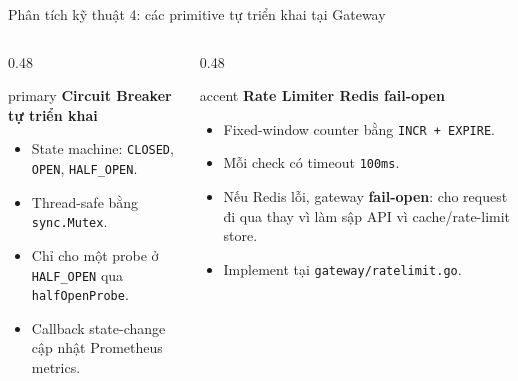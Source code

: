 \documentclass[aspectratio=169]{beamer}
\begin{document}
\begin{frame}{Phân tích kỹ thuật 4: các primitive tự triển khai tại Gateway}
    \begin{columns}[T,onlytextwidth]
        \begin{column}{0.48\textwidth}
            \begin{claimbox}{primary}
                \textbf{Circuit Breaker tự triển khai}
                \begin{itemize}\small
                    \item State machine: \texttt{CLOSED}, \texttt{OPEN}, \texttt{HALF\_OPEN}.
                    \item Thread-safe bằng \texttt{sync.Mutex}.
                    \item Chỉ cho một probe ở \texttt{HALF\_OPEN} qua \texttt{halfOpenProbe}.
                    \item Callback state-change cập nhật Prometheus metrics.
                \end{itemize}
            \end{claimbox}
        \end{column}
        \begin{column}{0.48\textwidth}
            \begin{claimbox}{accent}
                \textbf{Rate Limiter Redis fail-open}
                \begin{itemize}\small
                    \item Fixed-window counter bằng \texttt{INCR + EXPIRE}.
                    \item Mỗi check có timeout \texttt{100ms}.
                    \item Nếu Redis lỗi, gateway \textbf{fail-open}: cho request đi qua thay vì làm sập API vì cache/rate-limit store.
                    \item Implement tại \texttt{gateway/ratelimit.go}.
                \end{itemize}
            \end{claimbox}
        \end{column}
    \end{columns}
\end{frame}
\end{document}
